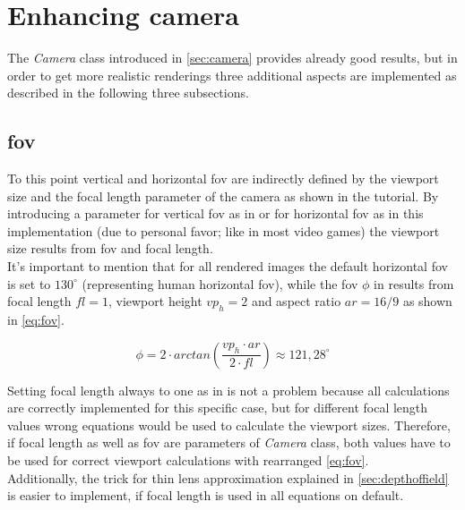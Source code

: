 \documentclass[]{article}
\begin{document}
	\section{Enhancing camera}
		The \emph{Camera} class introduced in \cref{sec:camera} provides already good results, but in order to get more realistic renderings three additional aspects are implemented as described in the following three subsections.
		
		\subsection{\ac{fov}}
		\label{sec:fov}
			To this point vertical and horizontal \ac{fov} are indirectly defined by the viewport size and the focal length parameter of the camera as shown in the tutorial. By introducing a parameter for vertical \ac{fov} as in \cite{Shirley2020RTW1} or for horizontal \ac{fov} as in this implementation (due to personal favor; like in most video games) the viewport size results from \ac{fov} and focal length.
			\\
			It's important to mention that for all rendered images the default horizontal \ac{fov} is set to $130^{\circ}$ (representing human horizontal \ac{fov}), while the \ac{fov} $\phi$ in \cite{Shirley2020RTW1} results from focal length $fl=1$, viewport height $vp_h=2$ and aspect ratio $ar=\label{key}16/9$ as shown in \cref{eq:fov}.
			
			\begin{equation}
				\label{eq:fov}
				\phi = 2\cdot arctan\left(\frac{vp_h\cdot ar}{2\cdot fl}\right) \approx 121,28^{\circ}
			\end{equation}
		 
			 Setting focal length always to one as in \cite{Shirley2020RTW1} is not a problem because all calculations are correctly implemented for this specific case, but for different focal length values wrong equations would be used to calculate the viewport sizes. Therefore, if focal length as well as \ac{fov} are parameters of \emph{Camera} class, both values have to be used for correct viewport calculations with rearranged \cref{eq:fov}. 
			 \\
			 Additionally, the trick for thin lens approximation explained in \cref{sec:depthoffield} is easier to implement, if focal length is used in all equations on default.
			
\end{document}
